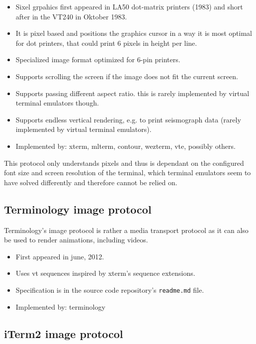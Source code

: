 \documentclass[a4paper]{article}
\begin{document}
\begin{itemize}
    \item Sixel grpahics first appeared in LA50 dot-matrix printers (1983) and short after in the VT240 in Oktober 1983.
    \item It is pixel based and positions the graphics cursor in a way it is most optimal for dot printers,
        that could print 6 pixels in height per line.
    \item Specialized image format optimized for 6-pin printers.
    \item Supports scrolling the screen if the image does not fit the current screen.
    \item Supports passing different aspect ratio. this is rarely implemented by virtual terminal emulators though.
    \item Supports endless vertical rendering, e.g. to print seismograph data (rarely implemented by virtual terminal emulators).
    \item Implemented by: xterm, mlterm, contour, wezterm, vte, possibly others.
\end{itemize}

This protocol only understands pixels and thus is dependant on the
configured font size and screen resolution of the terminal, which
terminal emulators seem to have solved differently and therefore cannot
be relied on.

\subsection{Terminology image protocol}

Terminology's image protocol is rather a media transport protocol as it
can also be used to render animations, including videos.

\begin{itemize}
    \item First appeared in june, 2012.
    \item Uses vt sequences inspired by xterm's sequence extensions.
    \item Specification is in the source code repository's \texttt{readme.md} file.
    \item Implemented by: terminology
\end{itemize}

\subsection{iTerm2 image protocol}
\end{document}
